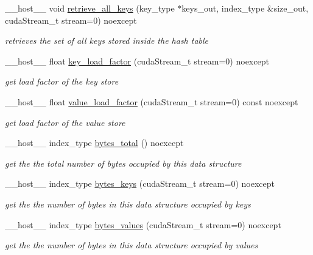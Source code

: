 \begin{DoxyCompactItemize}
\+\_\+\+\_\+host\+\_\+\+\_\+ void \hyperlink{classwarpcore_1_1MultiValueHashTable_ae12192811f1d955bb3dc8483b52ed999}{retrieve\+\_\+all\+\_\+keys} (key\+\_\+type $\ast$keys\+\_\+out, index\+\_\+type \&size\+\_\+out, cuda\+Stream\+\_\+t stream=0) noexcept
\begin{DoxyCompactList}\small\item\em retrieves the set of all keys stored inside the hash table \end{DoxyCompactList}\item 
\+\_\+\+\_\+host\+\_\+\+\_\+ float \hyperlink{classwarpcore_1_1MultiValueHashTable_a3c84877469284ea0edfe5a0b62abe765}{key\+\_\+load\+\_\+factor} (cuda\+Stream\+\_\+t stream=0) noexcept
\begin{DoxyCompactList}\small\item\em get load factor of the key store \end{DoxyCompactList}\item 
\+\_\+\+\_\+host\+\_\+\+\_\+ float \hyperlink{classwarpcore_1_1MultiValueHashTable_ad5ae5724768b34c344c95d7b4b736ab3}{value\+\_\+load\+\_\+factor} (cuda\+Stream\+\_\+t stream=0) const noexcept
\begin{DoxyCompactList}\small\item\em get load factor of the value store \end{DoxyCompactList}\item 
\+\_\+\+\_\+host\+\_\+\+\_\+ index\+\_\+type \hyperlink{classwarpcore_1_1MultiValueHashTable_a99e15b4fe9bfa63f8b1c823a3c030971}{bytes\+\_\+total} () noexcept
\begin{DoxyCompactList}\small\item\em get the the total number of bytes occupied by this data structure \end{DoxyCompactList}\item 
\+\_\+\+\_\+host\+\_\+\+\_\+ index\+\_\+type \hyperlink{classwarpcore_1_1MultiValueHashTable_a86f06bcb085fb809d8f40d3c044a078b}{bytes\+\_\+keys} (cuda\+Stream\+\_\+t stream=0) noexcept
\begin{DoxyCompactList}\small\item\em get the the number of bytes in this data structure occupied by keys \end{DoxyCompactList}\item 
\+\_\+\+\_\+host\+\_\+\+\_\+ index\+\_\+type \hyperlink{classwarpcore_1_1MultiValueHashTable_a158b338a5c798cc0775fd8874bc6e571}{bytes\+\_\+values} (cuda\+Stream\+\_\+t stream=0) noexcept
\begin{DoxyCompactList}\small\item\em get the the number of bytes in this data structure occupied by values \end{DoxyCompactList}\item 

\end{DoxyCompactItemize}
